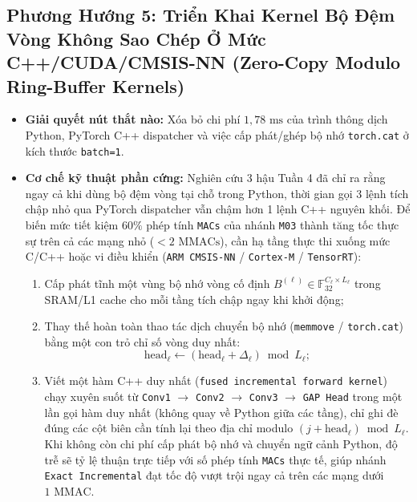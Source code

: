 \documentclass[11pt,a4paper]{article}
\newcommand{\F}{\mathbb{F}}
\newcommand{\code}[1]{{\small\ttfamily\nolinkurl{#1}}}
\begin{document}
\subsection{Phương Hướng 5: Triển Khai Kernel Bộ Đệm Vòng Không Sao Chép Ở Mức C++/CUDA/CMSIS-NN (Zero-Copy Modulo Ring-Buffer Kernels)}
\begin{itemize}
  \item \textbf{Giải quyết nút thắt nào:} Xóa bỏ chi phí $1,78\text{ ms}$ của trình thông dịch Python, PyTorch C++ dispatcher và việc cấp phát/ghép bộ nhớ \code{torch.cat} ở kích thước \code{batch=1}.
  \item \textbf{Cơ chế kỹ thuật phần cứng:} Nghiên cứu 3 hậu Tuần 4 đã chỉ ra rằng ngay cả khi dùng bộ đệm vòng tại chỗ trong Python, thời gian gọi 3 lệnh tích chập nhỏ qua PyTorch dispatcher vẫn chậm hơn 1 lệnh C++ nguyên khối. Để biến mức tiết kiệm $60\%$ phép tính \code{MACs} của nhánh \code{M03} thành tăng tốc thực sự trên cả các mạng nhỏ ($< 2\text{ MMACs}$), cần hạ tầng thực thi xuống mức C/C++ hoặc vi điều khiển (\code{ARM CMSIS-NN} / \code{Cortex-M} / \code{TensorRT}):
  \begin{enumerate}
    \item Cấp phát tĩnh một vùng bộ nhớ vòng cố định $B^{(\ell)} \in \F_{32}^{C_\ell \times L_\ell}$ trong SRAM/L1 cache cho mỗi tầng tích chập ngay khi khởi động;
    \item Thay thế hoàn toàn thao tác dịch chuyển bộ nhớ (\code{memmove} / \code{torch.cat}) bằng một con trỏ chỉ số vòng duy nhất:
    \begin{equation}
      \text{head}_\ell \leftarrow (\text{head}_\ell + \Delta_\ell) \bmod L_\ell;
    \end{equation}
    \item Viết một hàm C++ duy nhất (\code{fused incremental forward kernel}) chạy xuyên suốt từ \code{Conv1} $\to$ \code{Conv2} $\to$ \code{Conv3} $\to$ \code{GAP Head} trong một lần gọi hàm duy nhất (không quay về Python giữa các tầng), chỉ ghi đè đúng các cột biên cần tính lại theo địa chỉ modulo $(j + \text{head}_\ell) \bmod L_\ell$. Khi không còn chi phí cấp phát bộ nhớ và chuyển ngữ cảnh Python, độ trễ sẽ tỷ lệ thuận trực tiếp với số phép tính \code{MACs} thực tế, giúp nhánh \code{Exact Incremental} đạt tốc độ vượt trội ngay cả trên các mạng dưới $1\text{ MMAC}$.
  \end{enumerate}
\end{itemize}

\end{document}
